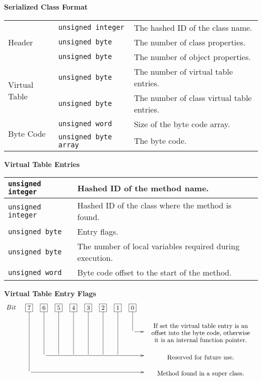 \textbf{Serialized Class Format}
\begin{center}
  \begin{tabular}{|l|l|p{8cm}|}
    \hline
    \multirow{3}{*}{Header} & \texttt{unsigned integer} & The hashed ID of the class name.\\ \cline{2-3}
    & \texttt{unsigned byte} & The number of class properties.\\ \cline{2-3}
    & \texttt{unsigned byte} & The number of object properties.\\ \hline

    \multirow{2}{*}{Virtual Table} & \texttt{unsigned byte} & The number of virtual table entries.\\ \cline{2-3}
    & \texttt{unsigned byte} & The number of class virtual table entries.\\ \hline

    \multirow{2}{*}{Byte Code} & \texttt{unsigned word} & Size of the byte code array.\\ \cline{2-3}
    & \texttt{unsigned byte array} & The byte code.\\ \hline
  \end{tabular}
\end{center}

\textbf{Virtual Table Entries}
\begin{center}
  \begin{tabular}{|l|p{8cm}|}
    \hline
    \texttt{unsigned integer} & Hashed ID of the method name.\\ \hline
    \texttt{unsigned integer} & Hashed ID of the class where the method is found.\\ \hline
    \texttt{unsigned byte} & Entry flags.\\ \hline
    \texttt{unsigned byte} & The number of local variables required during execution.\\ \hline
    \texttt{unsigned word} & Byte code offset to the start of the method.\\ \hline
  \end{tabular}
\end{center}

\textbf{Virtual Table Entry Flags}
\begin{displaymath}
  \xymatrix @-1pc {Bit &*+[F]{7} \ar @{-} [ddd]&*+[F]{6} \ar @{-} [dd] &*+[F]{5} \ar @{-} [dd] &*+[F]{4} \ar @{-} [dd] &*+[F]{3} \ar @{-} [dd] &*+[F]{2} \ar @{-} [dd]
    &*+[F]{1} \ar @{-} [dd] &*+[F]{0} \ar @{-} [d] & \\
    & & & & & & & & \ar [r] & \txt<6cm>{If set the virtual table entry is an offset into the byte code, otherwise it is an internal function pointer.}\\
    & & \ar [rrrrrrr] & & & & & & & \txt<6cm>{Reserved for future use.}\\
    & \ar [rrrrrrrr] & & & & & & & & \txt<6cm>{Method found in a super class.}}
\end{displaymath}
